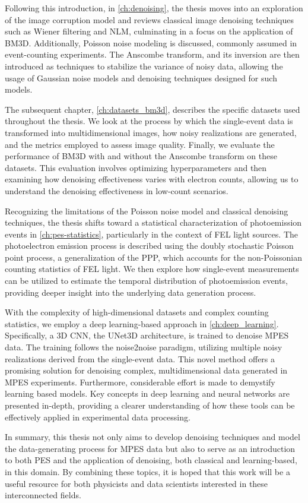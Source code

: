 Following this introduction, in \cref{ch:denoising}, the thesis moves into an exploration of the image corruption model and reviews  classical image denoising techniques such as Wiener filtering and \gls{NLM}, culminating in a focus on the application of \gls{BM3D}. Additionally, Poisson noise modeling is discussed, commonly assumed in event-counting experiments. The Anscombe transform, and its inversion are then introduced as techniques to stabilize the variance of noisy data, allowing the usage of Gaussian noise models and denoising techniques designed for such models.

The subsequent chapter, \cref{ch:datasets_bm3d}, describes the specific datasets used throughout the thesis. We look at the  process by which the single-event data is transformed into multidimensional images, how noisy realizations are generated, and the metrics employed to assess image quality. Finally, we evaluate the performance of \gls{BM3D} with and without the Anscombe transform on these datasets. This evaluation involves optimizing hyperparameters and then examining how denoising effectiveness varies with electron counts, allowing us to understand the denoising effectiveness in low-count scenarios.

Recognizing the limitations of the Poisson noise model and classical denoising techniques, the thesis shifts toward a statistical characterization of photoemission events in \cref{ch:pes-statistics}, particularly in the context of \gls{FEL} light sources. The photoelectron emission process is described using the doubly stochastic Poisson point process, a generalization of the \gls{PPP}, which accounts for the non-Poissonian counting statistics of \gls{FEL} light. We then explore how single-event measurements can be utilized to estimate the temporal distribution of photoemission events, providing deeper insight into the underlying data generation process.

With the complexity of high-dimensional datasets and complex counting statistics, we employ a deep learning-based approach in \cref{ch:deep_learning}. Specifically, a 3D \gls{CNN}, the UNet3D architecture, is trained to denoise \gls{MPES} data. The training follows the \gls{noise2noise} paradigm, utilizing multiple noisy realizations derived from the single-event data. This novel method offers a promising solution for denoising complex, multidimensional data generated in \gls{MPES} experiments. Furthermore, considerable effort is made to demystify learning based models. Key concepts in deep learning and neural networks are presented in-depth, providing a clearer understanding of how these tools can be effectively applied in experimental data processing.

In summary, this thesis not only aims to develop denoising techniques and model the data-generating process for \gls{MPES} data but also to serve as an introduction to both \gls{PES} and the application of denoising, both classical and learning-based, in this domain. By combining these topics, it is hoped that this work will be a useful resource for both physicists and data scientists interested in these interconnected fields.